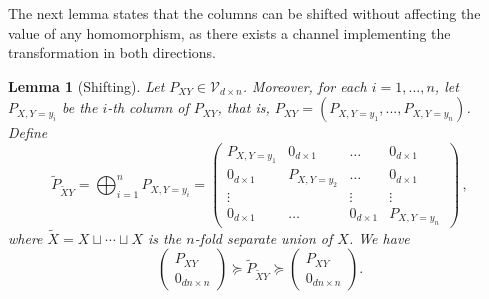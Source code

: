 \documentclass[aps,pra,11pt,onecolumn,nofootinbib,tightenlines]{revtex4-2}
\newtheorem{lemma}[theorem]{Lemma}
\theoremstyle{definition}
\newcommand{\V}{\mathcal{V}}
\begin{document}
The next lemma states that the columns can be shifted without affecting the value of any homomorphism, as there exists a channel implementing the transformation in both directions.
\begin{lemma}[Shifting]\label{lemma:shifting}
    Let $P_{XY} \in \V_{d\times n}$. Moreover,  for each $i=1,...,n$, let $P_{X,Y=y_i}$ be the $i$-th column of $P_{XY}$, that is, $P_{XY} = (P_{X,Y=y_1},...,P_{X,Y=y_n})$. Define
    \begin{equation}
\widetilde{P}_{\widetilde{X}Y}=\bigoplus_{i=1}^n P_{X,Y=y_i}= \begin{pmatrix}
P_{X,Y=y_1} & 0_{d \times 1}  & \hdots & 0_{d \times 1} \\
0_{d \times 1} & P_{X,Y=y_2} & \hdots & 0_{d \times 1} \\
\vdots &  & \vdots & \vdots\\
0_{d \times 1} & \hdots & 0_{d \times 1} & P_{X,Y=y_n}\,
\end{pmatrix} \,,
\end{equation} 
where $\widetilde{X}=X\sqcup\cdots\sqcup X$ is the $n$-fold separate union of $X$. We have
\begin{equation}
 \begin{pmatrix}
        P_{XY}\\
        0_{dn \times n}
    \end{pmatrix}\succeq\widetilde{P}_{\widetilde{X}Y}\succeq  \begin{pmatrix}
        P_{XY}\\
        0_{dn \times n}
    \end{pmatrix}.
\end{equation}
\end{lemma}
\end{document}
